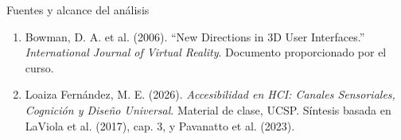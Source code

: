 \documentclass[aspectratio=169,11pt]{beamer}
\begin{document}
\begin{frame}{Fuentes y alcance del análisis}
  \small
  \begin{enumerate}
    \item Bowman, D. A. et al. (2006). “New Directions in 3D User Interfaces.” \textit{International Journal of Virtual Reality}. Documento proporcionado por el curso.
    \vspace{.55em}
    \item Loaiza Fernández, M. E. (2026). \textit{Accesibilidad en HCI: Canales Sensoriales, Cognición y Diseño Universal}. Material de clase, UCSP. Síntesis basada en LaViola et al. (2017), cap. 3, y Pavanatto et al. (2023).
  \end{enumerate}

\end{frame}
\end{document}
